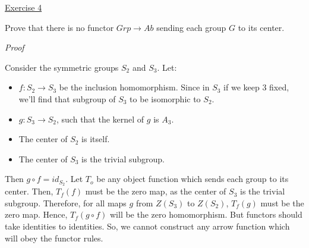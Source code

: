 \noindent
\underline{Exercise 4}
\vspace{2mm}

Prove that there is no functor $Grp \rightarrow Ab$ sending each group $G$ to its center. 

\vspace{2mm}

\noindent
\emph{Proof}

Consider the symmetric groups $S_2$ and $S_3$. Let: 
\begin{itemize}
	\item $f : S_2 \rightarrow S_3$ be the inclusion homomorphism. Since in $S_3$ if we keep $3$ fixed, we'll find that subgroup of $S_3$ to be isomorphic to $S_2$. 
	\item $g: S_3 \rightarrow S_2$, such that the kernel of $g$ is $A_3$.  
	\item The center of $S_2$ is itself.
	\item The center of $S_3$ is the trivial subgroup. 
\end{itemize}

Then $g \circ f = id_{S_2}$. Let $T_o$ be any object function which sends each group to its center. Then, $T_f(f)$ must be the zero map, as the center of $S_3$ is the trivial subgroup. Therefore, for all maps $g$ from $Z(S_3)$ to $Z(S_2)$, $T_f(g)$ must be the zero map. Hence, $T_f(g \circ f)$ will be the zero homomorphism. But functors should take identities to identities. So, we cannot construct any arrow function which will obey the functor rules. 

\vspace{2mm}
